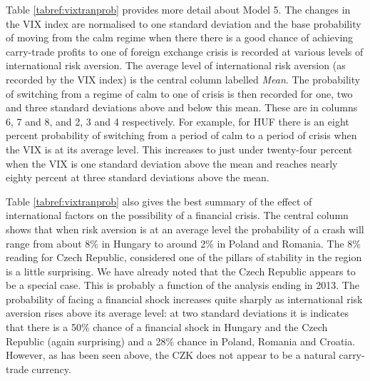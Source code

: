 \documentclass[12pt, a4paper, oneside]{article}\usepackage[]{graphicx}\usepackage[]{color}
\begin{document}
Table \ref{tabref:vixtranprob} provides more detail about Model 5.  The changes in the VIX index are normalised to one standard deviation and the base probability of moving from the calm regime when there there is a good chance of achieving carry-trade profits to one of foreign exchange crisis is recorded at various levels of international risk aversion.  The average level of international risk aversion (as recorded by the VIX index) is the central column labelled \emph{Mean}.  The probability of switching from a regime of calm to one of crisis is then recorded for one, two and three standard deviations above and below this mean.  These are in columns 6, 7 and 8, and 2, 3 and 4 respectively.  For example, for HUF there is an eight percent  probability of switching from a period of calm to a period of crisis when the VIX is at its average level. This increases to just under twenty-four percent when the VIX is one standard deviation above the mean and reaches nearly eighty percent at three standard deviations above the mean. 

Table \ref{tabref:vixtranprob} also gives the best summary of the effect of international factors on the possibility of a financial crisis.  The central column shows that when risk aversion is at an average level the probability of a crash will range from about 8\% in Hungary to around 2\% in Poland and Romania.  The 8\% reading for Czech Republic, considered one of the pillars of stability in the region is a little surprising. We have already noted that the Czech Republic appears to be a special case. This is probably a function of the analysis ending in 2013.  The probability of facing a financial shock increases quite sharply as international risk aversion rises above its average level: at two standard deviations it is indicates that there is a 50\% chance of a financial shock in Hungary and the Czech Republic (again surprising) and a 28\% chance in Poland, Romania and Croatia. However, as has been seen above, the CZK does not appear to be a natural carry-trade currency.
\end{document}
